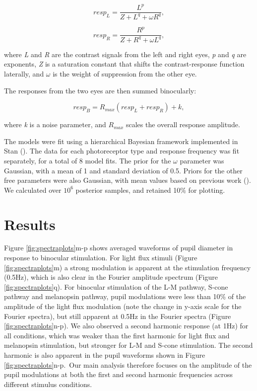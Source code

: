 \documentclass[
]{article}
\begin{document}
\begin{equation}
\label{eq:respL}
resp_L = \frac{L^p}{Z + L^q + \omega R^q},
\end{equation}

\begin{equation}
\label{eq:respR}
resp_R = \frac{R^p}{Z + R^q + \omega L^q},
\end{equation}

\noindent where \emph{L} and \emph{R} are the contrast signals from the left and right eyes, \emph{p} and \emph{q} are exponents, \emph{Z} is a saturation constant that shifts the contrast-response function laterally, and \(\omega\) is the weight of suppression from the other eye.

The responses from the two eyes are then summed binocularly:

\begin{equation}
\label{eq:respB}
resp_B = R_{max}(resp_L + resp_R) + k,
\end{equation}

\noindent where \emph{k} is a noise parameter, and \(R_{max}\) scales the overall response amplitude.

The models were fit using a hierarchical Bayesian framework implemented in Stan (). The data for each photoreceptor type and response frequency was fit separately, for a total of 8 model fits. The prior for the \(\omega\) parameter was Gaussian, with a mean of 1 and standard deviation of 0.5. Priors for the other free parameters were also Gaussian, with mean values based on previous work (). We calculated over \ensuremath{10^{6}} posterior samples, and retained 10\% for plotting.

\section{Results}\label{results}

Figure \ref{fig:spectraplots}m-p shows averaged waveforms of pupil diameter in response to binocular stimulation. For light flux stimuli (Figure \ref{fig:spectraplots}m) a strong modulation is apparent at the stimulation frequency (0.5Hz), which is also clear in the Fourier amplitude spectrum (Figure \ref{fig:spectraplots}q). For binocular stimulation of the L-M pathway, S-cone pathway and melanopsin pathway, pupil modulations were less than 10\% of the amplitude of the light flux modulation (note the change in y-axis scale for the Fourier spectra), but still apparent at 0.5Hz in the Fourier spectra (Figure \ref{fig:spectraplots}n-p). We also observed a second harmonic response (at 1Hz) for all conditions, which was weaker than the first harmonic for light flux and melanopsin stimulation, but stronger for L-M and S-cone stimulation. The second harmonic is also apparent in the pupil waveforms shown in Figure \ref{fig:spectraplots}n-p.~Our main analysis therefore focuses on the amplitude of the pupil modulations at both the first and second harmonic frequencies across different stimulus conditions.
\end{document}
